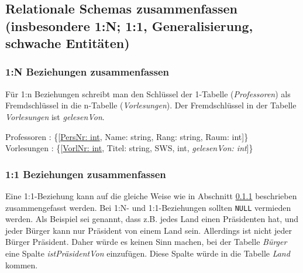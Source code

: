 \subsection{Relationale Schemas zusammenfassen (insbesondere 1:N; 1:1, Generalisierung, schwache Entitäten)}
\label{sec:schema-zusammenfassen}

\subsubsection{1:N Beziehungen zusammenfassen}
\label{sec:1-n-zusammenfassen}

Für 1:n Beziehungen schreibt man den Schlüssel der 1-Tabelle (\emph{Professoren}) als Fremdschlüssel in die n-Tabelle (\emph{Vorlesungen}). Der Fremdschlüssel in der Tabelle \emph{Vorlesungen} ist \emph{gelesenVon}.

\begin{center}
Professoren : \{[\underline{PersNr: int}, Name: string, Rang: string, Raum: int]\} \\
Vorlesungen : \{[\underline{VorlNr: int}, Titel: string, SWS, int, \emph{gelesenVon: int}]\} \\
\end{center}

\subsubsection{1:1 Beziehungen zusammenfassen}

Eine 1:1-Beziehung kann auf die gleiche Weise wie in Abschnitt \ref{sec:1-n-zusammenfassen} beschrieben zusammengefasst werden. Bei 1:N- und 1:1-Beziehungen sollten \texttt{NULL} vermieden werden. Als Beispiel sei genannt, dass z.B. jedes Land einen Präsidenten hat, und jeder Bürger kann nur Präsident von einem Land sein. Allerdings ist nicht jeder Bürger Präsident. Daher würde es keinen Sinn machen, bei der Tabelle \emph{Bürger} eine Spalte \emph{istPräsidentVon} einzufügen. Diese Spalte würde in die Tabelle \emph{Land} kommen.

